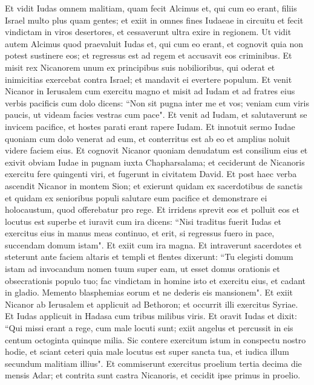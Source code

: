 \begin{biblechapter}
\verse Et vidit Iudas omnem malitiam, quam fecit Alcimus et, qui cum eo erant, filiis Israel multo plus quam gentes; 
\verse et exiit in omnes fines Iudaeae in circuitu et fecit vindictam in viros desertores, et cessaverunt ultra exire in regionem. 
\verse Ut vidit autem Alcimus quod praevaluit Iudas et, qui cum eo erant, et cognovit quia non potest sustinere eos; et regressus est ad regem et accusavit eos criminibus. 
\verse Et misit rex Nicanorem unum ex principibus suis nobilioribus, qui oderat et inimicitias exercebat contra Israel; et mandavit ei evertere populum. 
\verse Et venit Nicanor in Ierusalem cum exercitu magno et misit ad Iudam et ad fratres eius verbis pacificis cum dolo 
\verse dicens: “Non sit pugna inter me et vos; veniam cum viris paucis, ut videam facies vestras cum pace". 
\verse Et venit ad Iudam, et salutaverunt se invicem pacifice, et hostes parati erant rapere Iudam. 
\verse Et innotuit sermo Iudae quoniam cum dolo venerat ad eum, et conterritus est ab eo et amplius noluit videre faciem eius. 
\verse Et cognovit Nicanor quoniam denudatum est consilium eius et exivit obviam Iudae in pugnam iuxta Chapharsalama; 
\verse et ceciderunt de Nicanoris exercitu fere quingenti viri, et fugerunt in civitatem David. 
\verse Et post haec verba ascendit Nicanor in montem Sion; et exierunt quidam ex sacerdotibus de sanctis et quidam ex senioribus populi salutare eum pacifice et demonstrare ei holocaustum, quod offerebatur pro rege. 
\verse Et irridens sprevit eos et polluit eos et locutus est superbe 
\verse et iuravit cum ira dicens: “Nisi traditus fuerit Iudas et exercitus eius in manus meas continuo, et erit, si regressus fuero in pace, succendam domum istam". Et exiit cum ira magna. 
\verse Et intraverunt sacerdotes et steterunt ante faciem altaris et templi et flentes dixerunt:  
\verse “Tu elegisti domum istam ad invocandum nomen tuum super eam, ut esset domus orationis et obsecrationis populo tuo; 
\verse fac vindictam in homine isto et exercitu eius, et cadant in gladio. Memento blasphemias eorum et ne dederis eis mansionem". 
\verse Et exiit Nicanor ab Ierusalem et applicuit ad Bethoron; et occurrit illi exercitus Syriae. 
\verse Et Iudas applicuit in Hadasa cum tribus milibus viris. Et oravit Iudas et dixit: 
\verse “Qui missi erant a rege, cum male locuti sunt; exiit angelus et percussit in eis centum octoginta quinque milia. 
\verse Sic contere exercitum istum in conspectu nostro hodie, et sciant ceteri quia male locutus est super sancta tua, et iudica illum secundum malitiam illius". 
\verse Et commiserunt exercitus proelium tertia decima die mensis Adar; et contrita sunt castra Nicanoris, et cecidit ipse primus in proelio. 

\end{biblechapter}
